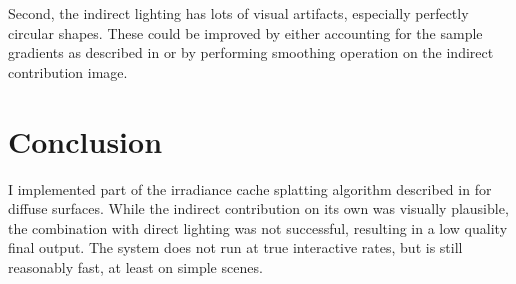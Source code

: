 \documentclass[10pt,twopage]{acmsiggraph}
\begin{document}
Second, the indirect lighting has lots of visual artifacts, especially perfectly circular shapes.  These could be improved by either accounting for the sample gradients as described in \cite{mainpaper} or by performing smoothing operation on the indirect contribution image.  

\section{Conclusion}
I implemented part of the irradiance cache splatting algorithm described in \cite{mainpaper} for diffuse surfaces.  While the indirect contribution on its own was visually plausible, the combination with direct lighting was not successful, resulting in a low quality final output.  The system does not run at true interactive rates, but is still reasonably fast, at least on simple scenes.  


{\small}

%
%


\cleardoublepage
\end{document}

